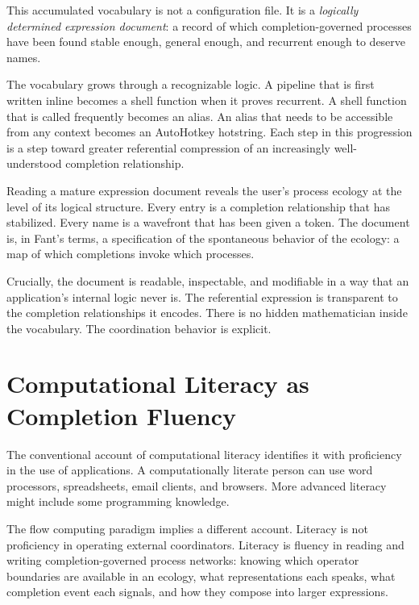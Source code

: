 \documentclass[12pt, a4paper]{article}
\begin{document}
This accumulated vocabulary is not a configuration file. It is a
\emph{logically determined expression document}: a record of which
completion-governed processes have been found stable enough, general
enough, and recurrent enough to deserve names.

The vocabulary grows through a recognizable logic. A pipeline that is
first written inline becomes a shell function when it proves
recurrent. A shell function that is called frequently becomes an
alias. An alias that needs to be accessible from any context becomes
an AutoHotkey hotstring. Each step in this progression is a step
toward greater referential compression of an increasingly well-
understood completion relationship.

Reading a mature expression document reveals the user's process
ecology at the level of its logical structure. Every entry is a
completion relationship that has stabilized. Every name is a
wavefront that has been given a token. The document is, in Fant's
terms, a specification of the spontaneous behavior of the ecology:
a map of which completions invoke which processes.

Crucially, the document is readable, inspectable, and modifiable in
a way that an application's internal logic never is. The referential
expression is transparent to the completion relationships it
encodes. There is no hidden mathematician inside the vocabulary.
The coordination behavior is explicit.

\section{Computational Literacy as Completion Fluency}

The conventional account of computational literacy identifies it with
proficiency in the use of applications. A computationally literate
person can use word processors, spreadsheets, email clients, and
browsers. More advanced literacy might include some programming
knowledge.

The flow computing paradigm implies a different account. Literacy is
not proficiency in operating external coordinators. Literacy is
fluency in reading and writing completion-governed process networks:
knowing which operator boundaries are available in an ecology, what
representations each speaks, what completion event each signals, and
how they compose into larger expressions.
\end{document}
